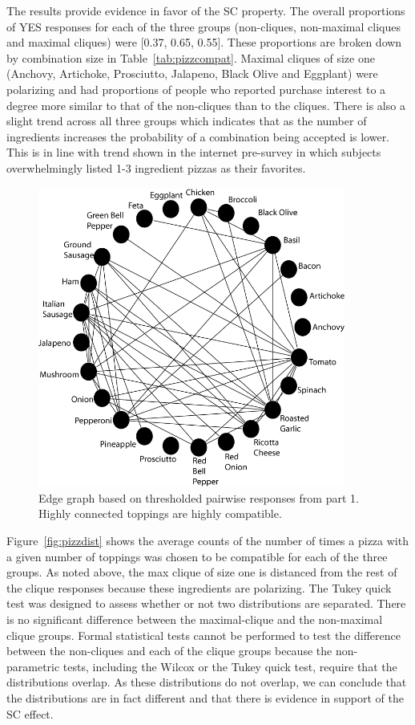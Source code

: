 The results provide evidence in favor of the SC property.  The overall proportions of YES responses for each of the three groups (non-cliques, non-maximal cliques and maximal cliques) were [0.37, 0.65, 0.55].  These proportions are broken down by combination size in Table~\ref{tab:pizzcompat}.  Maximal cliques of size one (Anchovy, Artichoke, Prosciutto, Jalapeno, Black Olive and Eggplant) were polarizing and had proportions of people who reported purchase interest to a degree more similar to that of the non-cliques than to the cliques. There is also a slight trend across all three groups which indicates that as the number of ingredients increases the probability of a combination being accepted is lower.  This is in line with trend shown in the internet pre-survey in which subjects overwhelmingly listed 1-3 ingredient pizzas as their favorites.

\begin{figure}[h!]
\caption[Edge graph based on thresholded pairwise responses from part 1]{Edge graph based on thresholded pairwise responses from part 1.  Highly connected toppings are highly compatible.}
\label{fig:pizzedge}
\centering
\includegraphics[width=0.9\textwidth]{./img/Figure43.png}
\end{figure}

Figure~\ref{fig:pizzdist} shows the average counts of the number of times a pizza with a given number of toppings was chosen to be compatible for each of the three groups.  As noted above, the max clique of size one is distanced from the rest of the clique responses because these ingredients are polarizing.  The Tukey quick test was designed to assess whether or not two distributions are separated.  There is no significant difference between the maximal-clique and the non-maximal clique groups.  Formal statistical tests cannot be performed to test the difference between the non-cliques and each of the clique groups because the non-parametric tests, including the Wilcox or the Tukey quick test, require that the distributions overlap.  As these distributions do not overlap, we can conclude that the distributions are in fact different and that there is evidence in support of the SC effect.  

